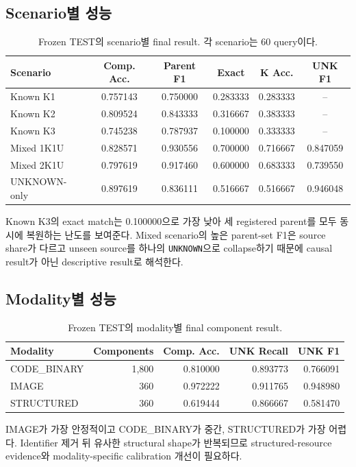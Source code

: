 \documentclass[runningheads]{llncs}
\begin{document}
\subsection{Scenario별 성능}
\begin{table}[!htbp]
\centering
\caption{Frozen TEST의 scenario별 final result. 각 scenario는 60 query이다.}
\label{tab:scenarioresult}
\scriptsize
\begin{tabular}{lccccc}
\toprule
Scenario & Comp. Acc. & Parent F1 & Exact & K Acc. & UNK F1\\
\midrule
Known K1 & 0.757143 & 0.750000 & 0.283333 & 0.283333 & --\\
Known K2 & 0.809524 & 0.843333 & 0.316667 & 0.383333 & --\\
Known K3 & 0.745238 & 0.787937 & 0.100000 & 0.333333 & --\\
Mixed 1K1U & 0.828571 & 0.930556 & 0.700000 & 0.716667 & 0.847059\\
Mixed 2K1U & 0.797619 & 0.917460 & 0.600000 & 0.683333 & 0.739550\\
UNKNOWN-only & 0.897619 & 0.836111 & 0.516667 & 0.516667 & 0.946048\\
\bottomrule
\end{tabular}
\end{table}
Known K3의 exact match는 0.100000으로 가장 낮아 세 registered parent를 모두 동시에 복원하는 난도를 보여준다. Mixed scenario의 높은 parent-set F1은 source share가 다르고 unseen source를 하나의 \texttt{UNKNOWN}으로 collapse하기 때문에 causal result가 아닌 descriptive result로 해석한다.

\subsection{Modality별 성능}
\begin{table}[!htbp]
\centering
\caption{Frozen TEST의 modality별 final component result.}
\label{tab:modality}
\scriptsize
\begin{tabular}{lrrrr}
\toprule
Modality & Components & Comp. Acc. & UNK Recall & UNK F1\\
\midrule
CODE\_BINARY & 1,800 & 0.810000 & 0.893773 & 0.766091\\
IMAGE & 360 & 0.972222 & 0.911765 & 0.948980\\
STRUCTURED & 360 & 0.619444 & 0.866667 & 0.581470\\
\bottomrule
\end{tabular}
\end{table}
IMAGE가 가장 안정적이고 CODE\_BINARY가 중간, STRUCTURED가 가장 어렵다. Identifier 제거 뒤 유사한 structural shape가 반복되므로 structured-resource evidence와 modality-specific calibration 개선이 필요하다.
\end{document}

